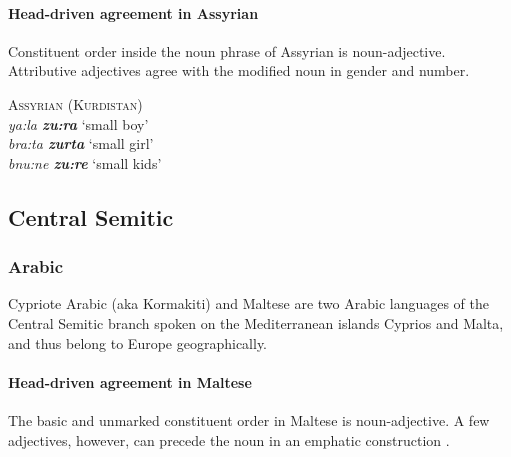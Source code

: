 \paragraph{Head-driven agreement in Assyrian}
Constituent order inside the noun phrase of Assyrian is noun-adjective. Attributive adjectives agree with the modified noun in gender and number.
\begin{exe}
\ex \textsc{Assyrian (Kurdistan)} \citep{krotkoff1982}\\
\textit{ya:la \textbf{zu:ra}} ‘small boy’\\
\textit{bra:ta \textbf{zurta}} ‘small girl’\\
\textit{bnu:ne \textbf{zu:re}} ‘small kids’
\end{exe}

\subsection{Central Semitic}		
\subsubsection{Arabic}
Cypriote Arabic (aka Kormakiti) and Maltese are two Arabic languages of the Central Semitic branch spoken on the Mediterranean islands Cyprios and Malta, and thus belong to Europe geographically.

\paragraph{Head-driven agreement in Maltese}
The basic and unmarked constituent order in Maltese is noun-adjective. A few adjectives, however, can precede the noun in an emphatic construction \citep[71]{borg-etal1996}.

